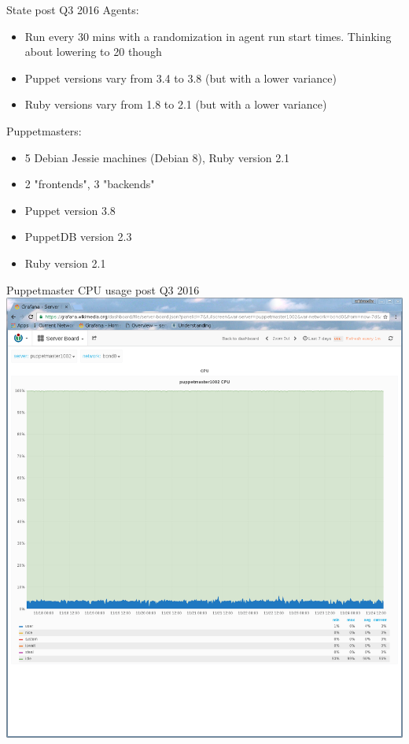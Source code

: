 \documentclass{beamer}
\begin{document}
    \begin{frame}{State post Q3 2016}
        Agents:
        \begin{itemize}
        \pause \item Run every 30 mins with a randomization in agent run start
            times. Thinking about lowering to 20 though
        \pause \item Puppet versions vary from 3.4 to 3.8 (but with a lower variance)
        \pause \item Ruby versions vary from 1.8 to 2.1 (but with a lower variance)
        \end{itemize}
        Puppetmasters:
        \begin{itemize}
            \pause \item 5 Debian Jessie machines (Debian 8), Ruby version 2.1
            \pause \item 2 "frontends", 3 "backends"
            \pause \item Puppet version 3.8
            \pause \item PuppetDB version 2.3
            \pause \item Ruby version 2.1
        \end{itemize}
    \end{frame}
    \begin{frame}{Puppetmaster CPU usage post Q3 2016}
        \includegraphics[width=\textwidth, height=\textheight]{cpu_usage_post_q3_2016.png}
    \end{frame}
\end{document}
